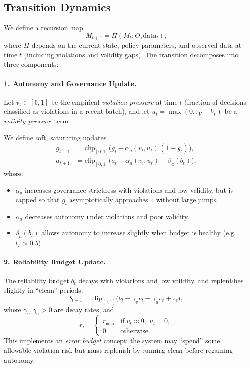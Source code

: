 \documentclass[11pt]{article}
\begin{document}
\subsection{Transition Dynamics}

We define a recursion map
\[
  M_{t+1} = \Pi(M_t; \Theta, \text{data}_t),
\]
where $\Pi$ depends on the current state, policy parameters, and observed data at time $t$ (including violations and validity gaps).
The transition decomposes into three components:

\paragraph{1. Autonomy and Governance Update.}

Let $v_t \in [0,1]$ be the empirical \emph{violation pressure} at time $t$ (fraction of decisions classified as violations in a recent batch), and let $u_t = \max(0,\tau_V - V_t)$ be a \emph{validity pressure} term.

We define soft, saturating updates:
\begin{align*}
  g_{t+1} &= \mathrm{clip}_{[0,1]}\bigl(g_t + \alpha_g (v_t, u_t)\, (1 - g_t)\bigr), \\
  a_{t+1} &= \mathrm{clip}_{[0,1]}\bigl(a_t - \alpha_a (v_t, u_t) + \beta_a(b_t)\bigr),
\end{align*}
where:
\begin{itemize}
  \item $\alpha_g$ increases governance strictness with violations and low validity, but is capped so that $g_t$ asymptotically approaches $1$ without large jumps.
  \item $\alpha_a$ decreases autonomy under violations and poor validity.
  \item $\beta_a(b_t)$ allows autonomy to increase slightly when budget is healthy (e.g.\ $b_t > 0.5$).
\end{itemize}

\paragraph{2. Reliability Budget Update.}

The reliability budget $b_t$ decays with violations and low validity, and replenishes slightly in ``clean'' periods:
\[
  b_{t+1} = \mathrm{clip}_{[0,1]}\bigl(b_t - \gamma_v v_t - \gamma_u u_t + r_t\bigr),
\]
where $\gamma_v,\gamma_u > 0$ are decay rates, and
\[
  r_t = \begin{cases}
    r_{\max} & \text{if } v_t \approx 0, \; u_t = 0, \\
    0 & \text{otherwise}.
  \end{cases}
\]
This implements an \emph{error budget} concept: the system may ``spend'' some allowable violation risk but must replenish by running clean before regaining autonomy.
\end{document}
